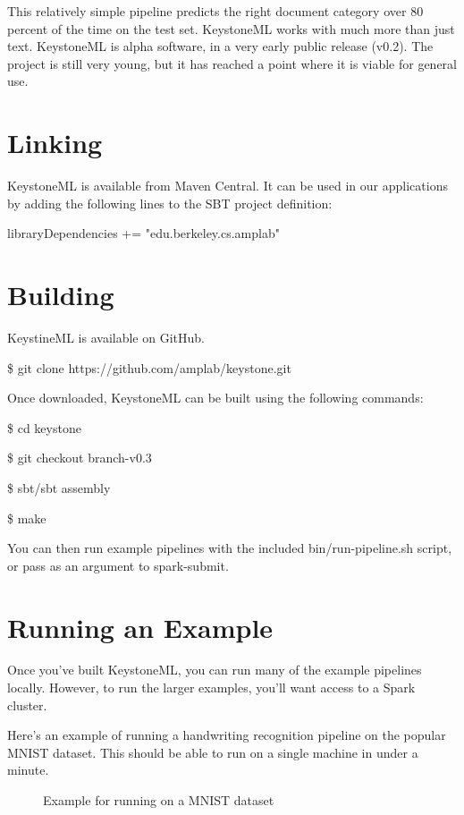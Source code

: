 \documentclass[9pt,twocolumn,twoside]{../../styles/osajnl}
\begin{document}
This relatively simple pipeline predicts the right document category
over 80 percent of the time on the test set. KeystoneML works with
much more than just text. KeystoneML is alpha software, in a very
early public release (v0.2). The project is still very young, but it
has reached a point where it is viable for general use.

\section{Linking}

KeystoneML is available from Maven Central. It can be used in our
applications by adding the following lines to the SBT project
definition:

libraryDependencies += "edu.berkeley.cs.amplab" %



\section{Building}

KeystineML is available on GitHub.

\$ git clone https://github.com/amplab/keystone.git

Once downloaded, KeystoneML can be built using the following commands:

\$ cd keystone

\$ git checkout branch-v0.3

\$ sbt/sbt assembly

\$ make

You can then run example pipelines with the included
bin/run-pipeline.sh script, or pass as an argument to spark-submit.

\section{Running an Example}

Once you’ve built KeystoneML, you can run many of the example
pipelines locally. However, to run the larger examples, you’ll want
access to a Spark cluster.

Here’s an example of running a handwriting recognition pipeline on the
popular MNIST dataset. This should be able to run on a single
machine in under a minute.

\begin{figure}[htbp]
\centering
{}
\caption{Example for running on a MNIST dataset}
\label{fig:Example for running on a MNIST dataset}
\end{figure}
\end{document}
